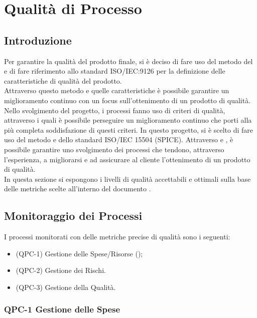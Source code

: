 \section{Qualità di Processo}

\subsection{Introduzione}

Per garantire la qualità del prodotto finale, si è deciso di fare uso del metodo del   e di fare riferimento allo standard ISO/IEC:9126 per la definizione delle caratteristiche di qualità del prodotto. \\
Attraverso questo metodo e quelle caratteristiche è possibile garantire un miglioramento continuo con un focus sull'ottenimento di un prodotto di qualità. \\

Nello svolgimento del progetto, i processi fanno uso di criteri di qualità, attraverso i quali è possibile perseguire un miglioramento continuo che porti alla più completa soddisfazione di questi criteri. In questo progetto, si è scelto di fare uso del metodo  e dello standard ISO/IEC 15504 (SPICE). Attraverso  e , è possibile garantire uno svolgimento dei processi che tendono, attraverso l'esperienza, a migliorarsi e ad assicurare al cliente l'ottenimento di un prodotto di qualità.\\
In questa sezione si espongono i livelli di qualità accettabili e ottimali sulla base delle metriche scelte all'interno del documento . \\

\subsection{Monitoraggio dei Processi}

I processi monitorati con delle metriche precise di qualità sono i seguenti:

\begin{itemize}
	\item (QPC-1) Gestione delle Spese/Risorse ();
	\item (QPC-2) Gestione dei Rischi.
	\item (QPC-3) Gestione della Qualità.
\end{itemize}

	\subsubsection{QPC-1 Gestione delle Spese}

